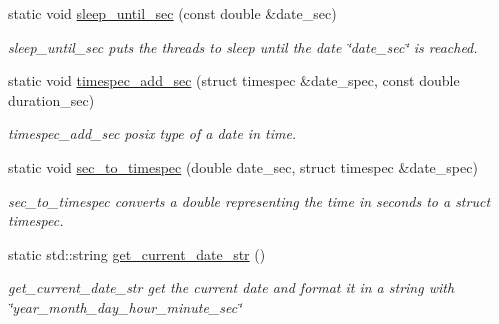 \begin{DoxyCompactItemize}
static void \hyperlink{classreal__time__tools_1_1Timer_a8de5eedf9fe5607d78a703cd22665137}{sleep\+\_\+until\+\_\+sec} (const double \&date\+\_\+sec)
\begin{DoxyCompactList}\small\item\em sleep\+\_\+until\+\_\+sec puts the threads to sleep until the date \char`\"{}date\+\_\+sec\char`\"{} is reached. \end{DoxyCompactList}\item 
static void \hyperlink{classreal__time__tools_1_1Timer_a0055b704a4e0b518269b0ab5fbed9278}{timespec\+\_\+add\+\_\+sec} (struct timespec \&date\+\_\+spec, const double duration\+\_\+sec)
\begin{DoxyCompactList}\small\item\em timespec\+\_\+add\+\_\+sec posix type of a date in time. \end{DoxyCompactList}\item 
static void \hyperlink{classreal__time__tools_1_1Timer_a7370c65fa7810c6bcbe1b2f33e21f2ff}{sec\+\_\+to\+\_\+timespec} (double date\+\_\+sec, struct timespec \&date\+\_\+spec)
\begin{DoxyCompactList}\small\item\em sec\+\_\+to\+\_\+timespec converts a double representing the time in seconds to a struct timespec. \end{DoxyCompactList}\item 
static std\+::string \hyperlink{classreal__time__tools_1_1Timer_a6e5ef2fc811582b8ff4fe52775525e14}{get\+\_\+current\+\_\+date\+\_\+str} ()\hypertarget{classreal__time__tools_1_1Timer_a6e5ef2fc811582b8ff4fe52775525e14}{}\label{classreal__time__tools_1_1Timer_a6e5ef2fc811582b8ff4fe52775525e14}

\begin{DoxyCompactList}\small\item\em get\+\_\+current\+\_\+date\+\_\+str get the current date and format it in a string with \char`\"{}year\+\_\+month\+\_\+day\+\_\+hour\+\_\+minute\+\_\+sec\char`\"{} \end{DoxyCompactList}\end{DoxyCompactItemize}
